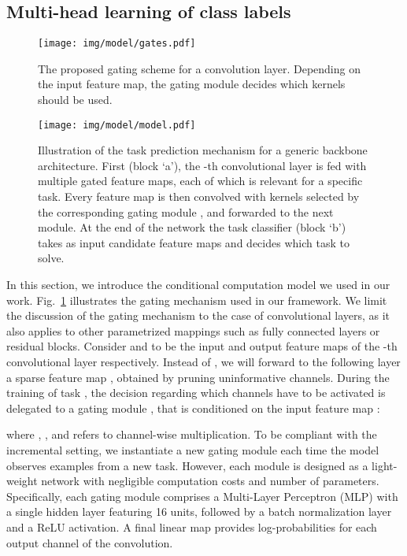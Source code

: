 \documentclass[10pt,twocolumn,letterpaper]{article}
\begin{document}
\subsection{Multi-head learning of class labels}
\label{sec:class_classification}
\def\hi{{\bf h}^l}
\def\ho{{\bf h}^{l+1}}
\def\hgo{\hat{{\bf h}}^{l+1}}
\newcommand{\G}[2]{G^{#1}_{#2}}
\def\Gtl{\G{l}{t}}
\begin{figure}
\centering
\texttt{[image: img/model/gates.pdf]}
\caption{The proposed gating scheme for a convolution layer. Depending on the input feature map, the gating module  decides which kernels should be used.}
\label{fig:gating}
\end{figure} \begin{figure*}[tb]
    \centering
    \texttt{[image: img/model/model.pdf]}
    \caption{Illustration of the task prediction mechanism for a generic backbone architecture. First (block `a'), the -th convolutional layer is fed with multiple gated feature maps, each of which is relevant for a specific task. Every feature map is then convolved with kernels selected by the corresponding gating module , and forwarded to the next module. At the end of the network the task classifier (block `b') takes as input candidate feature maps and decides which task to solve.}
    \label{fig:model}
\end{figure*} In this section, we introduce the conditional computation model we used in our work. Fig.~\ref{fig:gating} illustrates the gating mechanism used in our framework. We limit the discussion of the gating mechanism to the case of convolutional layers, as it also applies to other parametrized mappings such as fully connected layers or residual blocks. Consider  and  to be the input and output feature maps of the -th convolutional layer respectively.
Instead of , we will forward to the following layer a sparse feature map , obtained by pruning uninformative channels. During the training of task , the decision regarding which channels have to be activated is delegated to a gating module , that is conditioned on the input feature map :

where , , and  refers to channel-wise multiplication.
To be compliant with the incremental setting, we instantiate a new gating module each time the model observes examples from a new task. However, each module is designed as a light-weight network with negligible computation costs and number of parameters. Specifically, each gating module comprises a Multi-Layer Perceptron (MLP) with a single hidden layer featuring 16 units, followed by a batch normalization layer~\cite{batchnorm} and a ReLU activation. A final linear map provides log-probabilities for each output channel of the convolution.
\end{document}
